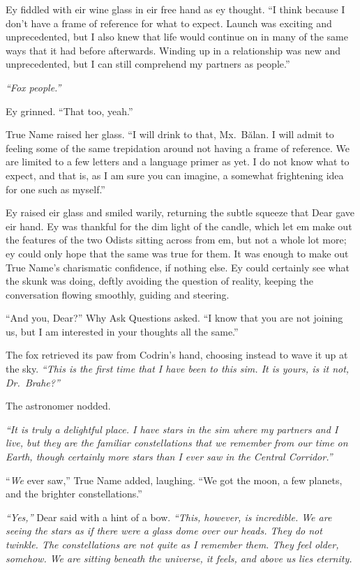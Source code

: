 Ey fiddled with eir wine glass in eir free hand as ey thought. ``I think because I don't have a frame of reference for what to expect. Launch was exciting and unprecedented, but I also knew that life would continue on in many of the same ways that it had before afterwards. Winding up in a relationship was new and unprecedented, but I can still comprehend my partners as people.''

\emph{``Fox people.''}

Ey grinned. ``That too, yeah.''

True Name raised her glass. ``I will drink to that, Mx.~Bălan. I will admit to feeling some of the same trepidation around not having a frame of reference. We are limited to a few letters and a language primer as yet. I do not know what to expect, and that is, as I am sure you can imagine, a somewhat frightening idea for one such as myself.''

Ey raised eir glass and smiled warily, returning the subtle squeeze that Dear gave eir hand. Ey was thankful for the dim light of the candle, which let em make out the features of the two Odists sitting across from em, but not a whole lot more; ey could only hope that the same was true for them. It was enough to make out True Name's charismatic confidence, if nothing else. Ey could certainly see what the skunk was doing, deftly avoiding the question of reality, keeping the conversation flowing smoothly, guiding and steering.

``And you, Dear?'' Why Ask Questions asked. ``I know that you are not joining us, but I am interested in your thoughts all the same.''

The fox retrieved its paw from Codrin's hand, choosing instead to wave it up at the sky. \emph{``This is the first time that I have been to this sim. It is yours, is it not, Dr.~Brahe?''}

The astronomer nodded.

\emph{``It is truly a delightful place. I have stars in the sim where my partners and I live, but they are the familiar constellations that we remember from our time on Earth, though certainly more stars than I ever saw in the Central Corridor.''}

``\emph{We} ever saw,'' True Name added, laughing. ``We got the moon, a few planets, and the brighter constellations.''

\emph{``Yes,''} Dear said with a hint of a bow. \emph{``This, however, is incredible. We are seeing the stars as if there were a glass dome over our heads. They do not twinkle. The constellations are not quite as I remember them. They feel older, somehow. We are sitting beneath the universe, it feels, and above us lies eternity.}

